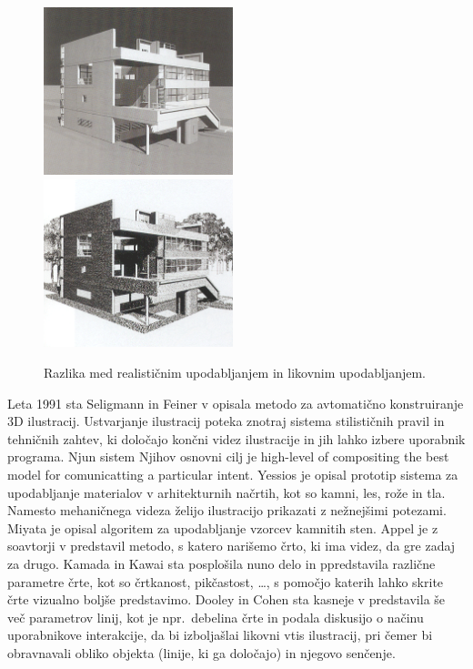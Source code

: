 \begin{figure}[htb]
  \includegraphics[width=0.49\textwidth]{./slike/real.png}
  \ \ 
  \includegraphics[width=0.49\textwidth]{./slike/npr.png}
  \caption{Razlika med realističnim upodabljanjem in likovnim upodabljanjem.}
\end{figure}
 
Leta 1991 sta Seligmann in Feiner v \cite{Seligmann:Automated} opisala metodo za avtomatično konstruiranje 3D %
ilustracij. Ustvarjanje ilustracij poteka znotraj sistema stilističnih pravil in tehničnih zahtev, ki določajo končni videz ilustracije in jih lahko izbere uporabnik programa. Njun sistem Njihov osnovni cilj je high-level of compositing the best model for comunicatting a particular intent. Yessios je opisal prototip sistema za upodabljanje materialov v arhitekturnih načrtih, kot so kamni, les, rože in tla. Namesto mehaničnega videza želijo ilustracijo prikazati z nežnejšimi potezami. %
Miyata \cite{Miyata:Stone} je opisal algoritem za upodabljanje vzorcev kamnitih sten. Appel je z soavtorji v \cite{Appel:Haloed} predstavil metodo, s katero narišemo črto, ki ima videz, da gre zadaj za drugo. Kamada in Kawai \cite{Kamada:Hidden} sta posplošila nuno delo in ppredstavila različne parametre črte, kot so črtkanost, pikčastost, \ldots, s pomočjo katerih lahko skrite črte vizualno boljše predstavimo. Dooley in Cohen sta kasneje v \cite{Dooley:Lines, Dooley:Surfaces}  predstavila še več parametrov linij, kot je npr.\ debelina črte in podala diskusijo o načinu uporabnikove interakcije, da bi izboljašlai likovni vtis ilustracij, pri čemer bi obravnavali obliko objekta (linije, ki ga določajo) in njegovo senčenje.


